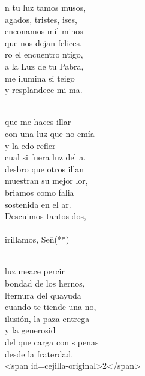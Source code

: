 \documentclass[12pt]{article}
\begin{document}
\begin{multicols*}{2}
\begin{cancion}%
	n tu luz tamos musos,\\
	agados, tristes, ises,\\
	enconamos mil minos\\
	que nos dejan felices.\\
	ro el encuentro ntigo,\\
	a la Luz de tu Pabra,\\
	me ilumina si teigo\\
	y resplandece mi ma.\\\jump\\
	\begin{chorus}%
	 que  me haces illar \\
	con una luz que no emía\\
	y la edo refler\\
	cual si fuera luz del a. \\
	desbro que otros illan\\
	muestran su mejor lor,\\
	briamos como falia\\
	sostenida en el ar.\\
	Descuimos tantos dos,\\
{}\vspace*{-0.4cm}\\
	irillamos, Señ(**) \\
	\end{chorus}%
	\jump\\
	 luz meace percir\\
	 bondad de los hernos,\\
	lternura del quayuda\\
	cuando te tiende una no,\\
	 ilusión, la paza entrega\\
	y la generosid\\
	del que carga con s penas\\
	desde la fraterdad. \\
<span id=cejilla-original>2</span>\\
\end{cancion}%


\end{multicols*}
\end{document}
